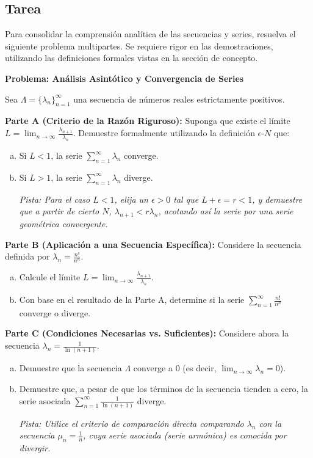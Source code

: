 \documentclass[a4paper]{article}
\begin{document}
\subsection{Tarea}

Para consolidar la comprensión analítica de las secuencias y series, resuelva el siguiente problema multipartes. Se requiere rigor en las demostraciones, utilizando las definiciones formales vistas en la sección de concepto.

\textbf{Problema: Análisis Asintótico y Convergencia de Series}

Sea $\Lambda = \{\lambda_n\}_{n=1}^{\infty}$ una secuencia de números reales estrictamente positivos.

\textbf{Parte A (Criterio de la Razón Riguroso):}
Suponga que existe el límite $L = \lim_{n \to \infty} \frac{\lambda_{n+1}}{\lambda_n}$.
Demuestre formalmente utilizando la definición $\epsilon$-$N$ que:
\begin{enumerate}[a)]
	\item Si $L < 1$, la serie $\sum_{n=1}^{\infty} \lambda_n$ converge.
	\item Si $L > 1$, la serie $\sum_{n=1}^{\infty} \lambda_n$ diverge.
	
\textit{Pista: Para el caso $L < 1$, elija un $\epsilon > 0$ tal que $L + \epsilon = r < 1$, y demuestre que a partir de cierto $N$, $\lambda_{n+1} < r \lambda_n$, acotando así la serie por una serie geométrica convergente.}
\end{enumerate}

\textbf{Parte B (Aplicación a una Secuencia Específica):}
Considere la secuencia definida por $\lambda_n = \frac{n!}{n^n}$.
\begin{enumerate}[a)]
	\item Calcule el límite $L = \lim_{n \to \infty} \frac{\lambda_{n+1}}{\lambda_n}$.
	\item Con base en el resultado de la Parte A, determine si la serie $\sum_{n=1}^{\infty} \frac{n!}{n^n}$ converge o diverge.
\end{enumerate}
\textbf{Parte C (Condiciones Necesarias vs. Suficientes):}
Considere ahora la secuencia $\lambda_n = \frac{1}{\ln(n+1)}$.
\begin{enumerate}[a)]
	\item Demuestre que la secuencia $\Lambda$ converge a $0$ (es decir, $\lim_{n \to \infty} \lambda_n = 0$).
	\item Demuestre que, a pesar de que los términos de la secuencia tienden a cero, la serie asociada $\sum_{n=1}^{\infty} \frac{1}{\ln(n+1)}$ diverge.
	
\textit{Pista: Utilice el criterio de comparación directa comparando $\lambda_n$ con la secuencia $\mu_n = \frac{1}{n}$, cuya serie asociada (serie armónica) es conocida por divergir.}
\end{enumerate}
\end{document}
